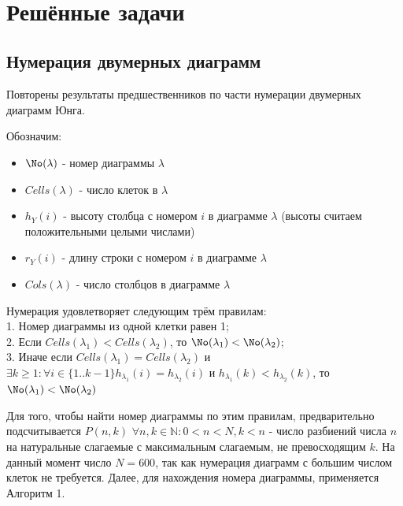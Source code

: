 \documentclass[12pt]{report}
\begin{document}
\newpage
\hfill {}\\

\section* {Решённые задачи}
\parindent=1cm
\newenvironment{myindentpar}[1]%
 {\begin{list}{}%
         {\setlength{\leftmargin}{#1}}%
         \item[]%
 }
 {\end{list}}
 
\subsection*{Нумерация двумерных диаграмм}
\hspace{\parindent} Повторены результаты предшественников по части нумерации двумерных диаграмм Юнга. 

Обозначим: 

\begin{itemize}
  \item $\No(\lambda)$  - номер диаграммы $\lambda$
  \item $Cells(\lambda)$  - число клеток в $\lambda$
  \item $h_Y(i)$ - высоту столбца с номером $i$ в диаграмме $\lambda$ (высоты считаем положительными целыми числами)
  \item $r_Y(i)$ - длину строки с номером $i$ в диаграмме $\lambda$
  \item $Cols(\lambda)$ - число столбцов в диаграмме $\lambda$
\end{itemize}
Нумерация удовлетворяет следующим трём правилам:\\
1. Номер диаграммы из одной клетки равен 1;\\
2. Если $Cells(\lambda_1) < Cells(\lambda_2)$, то $\No(\lambda_1) < \No(\lambda_2)$;\\
3. Иначе если $Cells(\lambda_1) = Cells(\lambda_2)$ и $\exists k \ge 1 : \forall i \in \{1..k-1\} h_{\lambda_1}(i) = h_{\lambda_2}(i)$ и $h_{\lambda_1}(k) < h_{\lambda_2}(k)$, то $\No(\lambda_1) < \No(\lambda_2)$

Для того, чтобы найти номер диаграммы по этим правилам, предварительно подсчитывается $P(n, k)$ $\forall n, k \in \mathbb{N} : 0 < n < N, k < n$ - число разбиений числа $n$ на натуральные слагаемые с максимальным слагаемым, не превосходящим $k$. На данный момент число $N = 600$, так как нумерация диаграмм с большим числом клеток не требуется. Далее, для нахождения номера диаграммы, применяется Алгоритм 1.
\vspace{1cm}
\end{document}
